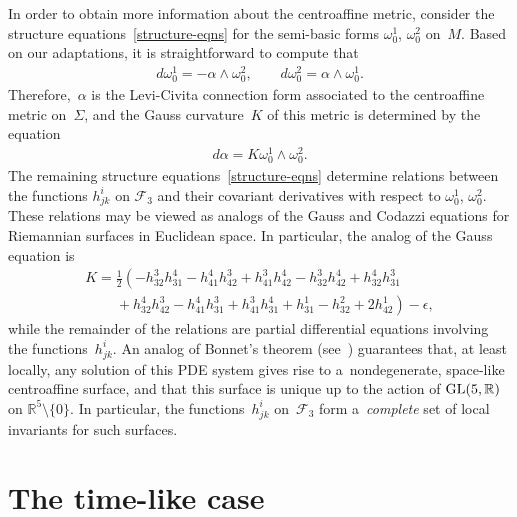 \documentclass[pdftex]{sigma}
\numberwithin{equation}{section}
\theoremstyle{definition}
\begin{document}
In order to obtain more information about the centroaf\/f\/ine metric, consider the structure
equations~\eqref{structure-eqns} for the semi-basic forms $\omega^1_0$, $\omega^2_0$ on~$M$.
Based on our adaptations, it is straightforward to compute that
\begin{gather*}
d\omega^1_0 = -\alpha \wedge \omega^2_0,
\qquad
d\omega^2_0 = \alpha \wedge \omega^1_0.
\end{gather*}
Therefore,~$\alpha$ is the Levi-Civita connection form associated to the centroaf\/f\/ine metric on~$\Sigma$, and the Gauss
curvature~$K$ of this metric is determined by the equation
\begin{gather*}
d\alpha = K  \omega^1_0 \wedge \omega^2_0.
\end{gather*}
The remaining structure equations~\eqref{structure-eqns} determine relations between the functions $h^i_{jk}$ on
$\mathcal{F}_3$ and their covariant derivatives with respect to $\omega^1_0$, $\omega^2_0$.
These relations may be viewed as analogs of the Gauss and Codazzi equations for Riemannian surfaces in Euclidean space.
In particular, the analog of the Gauss equation is
\begin{gather}
K = \tfrac{1}{2}\left(-h^3_{32} h^4_{31} - h^4_{41} h^3_{42} + h^3_{41} h^4_{42} - h^3_{32} h^4_{42} + h^4_{32}
h^3_{31} \right.
\nonumber
\\
\left.\phantom{K=}{}
+ h^4_{32} h^3_{42} - h^4_{41} h^3_{31} + h^3_{41} h^4_{31} + h^1_{31} - h^2_{32} + 2h^1_{42} \right) - \epsilon,
\label{space-like-Gauss-eqn}
\end{gather}
while the remainder of the relations are partial dif\/ferential equations involving the func\-tions~$h^i_{jk}$.
An analog of Bonnet's theorem (see~\cite{Griffiths74}) guarantees that, at least locally, any solution of this PDE
system gives rise to a~nondegenerate, space-like centroaf\/f\/ine surface, and that this surface is unique up to the action
of ${\rm GL}(5,\mathbb{R})$ on $\mathbb{R}^5 \setminus \{0 \}$.
In particular, the functions~$h^i_{jk}$ on~$\mathcal{F}_3$ form a~{\em complete} set of local invariants for such
surfaces.

\section{The time-like case}\label{time-like-sec}
\end{document}
